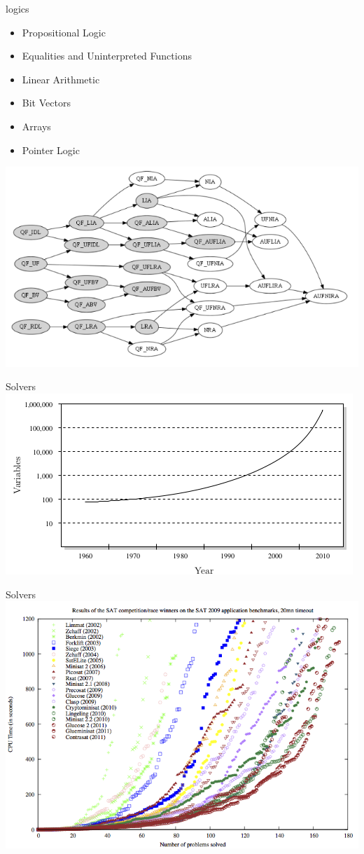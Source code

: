 \documentclass[mathserif]{beamer}
\begin{document}
\begin{frame}{logics}
\begin{itemize}
\item Propositional Logic
\item Equalities and Uninterpreted Functions
\item Linear Arithmetic
\item Bit Vectors
\item Arrays
\item Pointer Logic
\end{itemize}
\includegraphics[scale=0.4]{logics.png}
\end{frame}

\begin{frame}{Solvers}
\includegraphics[scale=0.6]{SAT_results0.png}
\end{frame}

\begin{frame}{Solvers}
\includegraphics[scale=0.4]{SAT_results1.png}
\end{frame}
\end{document}
